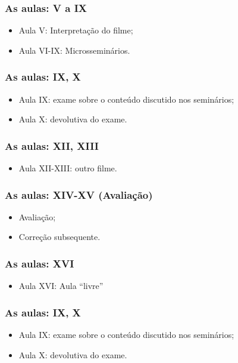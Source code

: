 \documentclass[12pt]{beamer}
\begin{document}
\begin{frame}
\frametitle{As aulas: V a IX}

	\begin{itemize}
		\item Aula V: Interpretação do filme; 
		\item Aula VI-IX: Microsseminários. 
	\end{itemize}

\end{frame}

\begin{frame}
\frametitle{As aulas: IX, X}

\begin{itemize}
	\item Aula IX: exame sobre o conteúdo discutido nos seminários; 
	\item Aula X: devolutiva do exame. 
\end{itemize}

\end{frame}

\begin{frame}
\frametitle{As aulas: XII, XIII}

\begin{itemize}
	\item Aula XII-XIII: outro filme. 
\end{itemize}

\end{frame}

\begin{frame}
\frametitle{As aulas: XIV-XV (Avaliação)}

\begin{itemize}
	\item Avaliação; 
	\item Correção subsequente. 
\end{itemize}

\end{frame}

\begin{frame}
\frametitle{As aulas: XVI}

\begin{itemize}
	\item Aula XVI: Aula ``livre''
\end{itemize}

\end{frame}

\begin{frame}
\frametitle{As aulas: IX, X}

\begin{itemize}
	\item Aula IX: exame sobre o conteúdo discutido nos seminários; 
	\item Aula X: devolutiva do exame. 
\end{itemize}

\end{frame}
\end{document}
